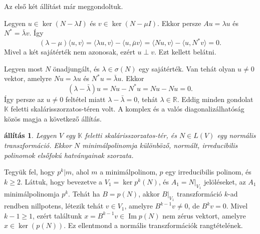 \documentclass[9pt, a4paper, showtrims]{memoir}
\makeatletter
\renewenvironment{proof}[1][\proofname]
    {\par\pushQED{\qed}%
    \normalfont \topsep6\p@\@plus6\p@\relax
    \trivlist
    \item[\hskip\labelsep
        \itshape
    #1\@addpunct{:}]\ignorespaces}
    {\popQED\endtrivlist\@endpefalse}
\theoremstyle{plain}
\newtheorem{proposition}{állítás}[chapter]
\theoremstyle{remark}
\theoremstyle{definition}
\DeclareMathOperator{\im}{Im}
\newcommand{\ip}[2]{\langle#1,#2\rangle}
\makeatother
\begin{document}
\begin{proof}
    Az első két állítást már meggondoltuk.

    Legyen 
    \begin{math}
        u\in\ker\left( N-\lambda I \right)
    \end{math}
    és
    \begin{math}
        v\in\ker\left( N-\mu I \right)
    \end{math}.
    Ekkor persze
    \begin{math}
        Au=\lambda u
    \end{math}
    és
    \begin{math}
        N^\ast=\bar{\lambda}v
    \end{math}.
    Így
    \[
        \left( \lambda-\mu \right)\ip{u}{v}
        =
        \ip{\lambda u}{v}-\ip{u}{\bar{\mu}v}
        =
        \ip{Nu}{v}-\ip{u}{N^\ast v}
        =
        0.
    \]
    Mivel a két sajátérték nem azonosak,
    ezért $u\perp v$.
    Ezt kellett belátni. 

    Legyen most $N$ önadjungált, és $\lambda\in\sigma\left( N \right)$ egy sajátérték.
    Van tehát olyan $u\neq 0$ vektor, amelyre $Nu=\lambda u$ és $N^\ast u=\bar{\lambda}u$.
    Ekkor 
    \[
        \left( \lambda-\bar{\lambda} \right)u
        =Nu-N^\ast u=Nu-Nu=0.
    \]
    Így persze az $u\neq 0$ feltétel miatt $\lambda-\bar{\lambda}=0$, tehát $\lambda\in\mathbb{R}.$
\end{proof}
Eddig minden gondolat $\mathbb{K}$ feletti skalárisszorzatos-téren volt.
A komplex és a valós diagonalizálhatóság közös magja a következő állítás.
\begin{proposition}\label{pr:normalis-mult1}
    Legyen $V$ egy $\mathbb{K}$ feletti skalárisszorzatos-tér, 
    és $N\in L\left( V \right)$ egy normális transzformáció.
    Ekkor $N$ minimálpolinomja különböző, normált, irreducibilis polinomok elsőfokú hatványainak szorzata.
\end{proposition}
\begin{proof}
    Tegyük fel, hogy $p^k|m$, ahol $m$ a minimálpolinom, 
    $p$ egy irreducibilis polinom, és $k\geq 2.$
    Láttuk, hogy bevezetve a $V_1=\ker p^k\left( N \right)$, és
    $A_1=N|_{V_1}$ jelöléseket,
    az $A_1$ minimálpolinomja $p^k$.
    Tehát ha $B=p(N)$, akkor $B|_{V_1}$ transzformáció $k$-ad rendben nillpotens,
    létezik tehát $v\in V_1$, 
    amelyre $B^{k-1}v\neq 0$, 
    de $B^kv=0$. 
    Mivel $k-1\geq 1$, ezért találtunk $x=B^{k-1}v\in\im p\left( N \right)$ 
    nem zérus vektort,
    amelyre $x\in\ker(p\left( N \right))$.
    Ez ellentmond a normális transzformációk rangtételének.
\end{proof}
\end{document}
